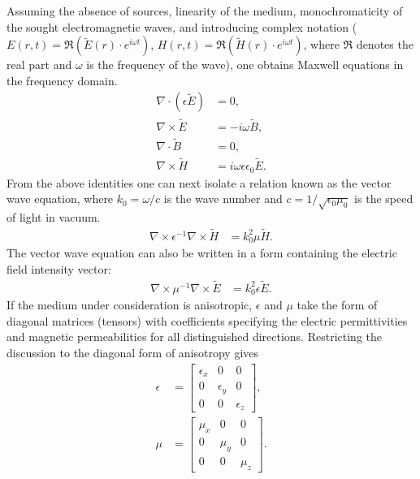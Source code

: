 \documentclass[12pt,a4paper]{article}
\begin{document}
Assuming the absence of sources, linearity of the medium, monochromaticity of the sought
electromagnetic waves, and introducing complex notation ($E(r,t)=\Re(\tilde E(r)\cdot e^{i\omega t})$,
$H(r,t)=\Re(\tilde H(r)\cdot e^{i\omega t})$, where $\Re$ denotes the real part and $\omega$ is the
frequency of the wave), one obtains Maxwell equations in the frequency domain.
\begin{align}
\nabla\cdot(\epsilon\tilde E) &= 0, \tag{2.6a}\\
\nabla\times\tilde E &= -i\omega\tilde B, \tag{2.6b}\\
\nabla\cdot\tilde B &= 0, \tag{2.6c}\\
\nabla\times\tilde H &= i\omega\epsilon\epsilon_0\tilde E. \tag{2.6d}
\end{align}
From the above identities one can next isolate a relation known as the vector wave equation, where
$k_0=\omega/c$ is the wave number and $c=1/\sqrt{\epsilon_0\mu_0}$ is the speed of light in vacuum.
\begin{align}
\nabla\times\epsilon^{-1}\nabla\times\tilde H &= k_0^2\mu\tilde H. \tag{2.7a}
\end{align}
The vector wave equation can also be written in a form containing the electric field intensity vector:
\begin{align}
\nabla\times\mu^{-1}\nabla\times\tilde E &= k_0^2\epsilon\tilde E. \tag{2.7b}
\end{align}
If the medium under consideration is anisotropic, $\epsilon$ and $\mu$ take the form of diagonal
matrices (tensors) with coefficients specifying the electric permittivities and magnetic permeabilities
for all distinguished directions. Restricting the discussion to the diagonal form of anisotropy gives
\begin{align}
\epsilon &=
\begin{bmatrix}
\epsilon_x&0&0\\
0&\epsilon_y&0\\
0&0&\epsilon_z
\end{bmatrix}, \tag{2.8a}\\
\mu &=
\begin{bmatrix}
\mu_x&0&0\\
0&\mu_y&0\\
0&0&\mu_z
\end{bmatrix}. \tag{2.8b}
\end{align}
\end{document}
